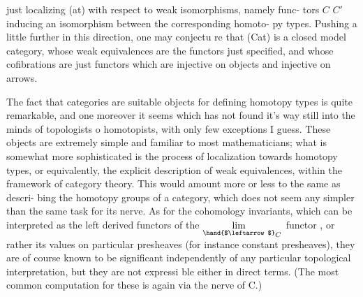 
just localizing (at) with respect to weak isomorphisms, namely func-%
tors $C$ \hand{$\to$} $C'$ inducing an isomorphism between the corresponding homoto-%
py types. Pushing a little further in this direction, one may conjectu%
re that (Cat) is a closed model category, whose weak equivalences are
the functors just specified, and whose cofibrations are just functors
which are injective on objects and injective on arrows.

The fact that categories are suitable objects for defining  homotopy
types is quite remarkable, and one moreover it seems which has not found
it's way still into the minds of topologists o homotopists, with only
few exceptions I guess. These objects are extremely simple and familiar
to most mathematicians; what is somewhat more sophisticated is the
process of localization towards homotopy types, or equivalently, the
explicit description of weak equivalences, within the framework of
 category theory. This would amount more or less to the same as descri-%
bing the homotopy groups of a category, which does not seem any simpler
than the same task for its nerve. As for the cohomology invariants, which
can be interpreted as the left derived functors of the $\underset{\hand{$\leftarrow$}}{\lim}_{C}$ functor ,
or rather its values on particular presheaves (for instance constant
presheaves), they are of course known to be significant\hand{,} independently
of any particular topological interpretation, but they are not expressi%
\hand{-}ble either in direct terms. (The most common computation for these is
again via the nerve of C.)

